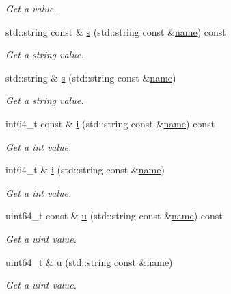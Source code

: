 \begin{DoxyCompactItemize}
\begin{DoxyCompactList}\small\item\em Get a value. \end{DoxyCompactList}\item 
std\+::string const  \& \hyperlink{class_settings_json_af6e26eec97fdd26f1ec720bbfe4df5b9}{s} (std\+::string const \&\hyperlink{class_settings_json_a301eda8c47d1140298fade3907c723d6}{name}) const
\begin{DoxyCompactList}\small\item\em Get a string value. \end{DoxyCompactList}\item 
std\+::string \& \hyperlink{class_settings_json_a28b88888063d5efe00ef2d8488129f2e}{s} (std\+::string const \&\hyperlink{class_settings_json_a301eda8c47d1140298fade3907c723d6}{name})
\begin{DoxyCompactList}\small\item\em Get a string value. \end{DoxyCompactList}\item 
int64\+\_\+t const  \& \hyperlink{class_settings_json_a79e1d47938088e08a84ac721807c1551}{i} (std\+::string const \&\hyperlink{class_settings_json_a301eda8c47d1140298fade3907c723d6}{name}) const
\begin{DoxyCompactList}\small\item\em Get a int value. \end{DoxyCompactList}\item 
int64\+\_\+t \& \hyperlink{class_settings_json_a0ccde304adda110610395b3b1f3b6fd0}{i} (std\+::string const \&\hyperlink{class_settings_json_a301eda8c47d1140298fade3907c723d6}{name})
\begin{DoxyCompactList}\small\item\em Get a int value. \end{DoxyCompactList}\item 
uint64\+\_\+t const  \& \hyperlink{class_settings_json_a94fe906c11e89abf423151c3816ec7d8}{u} (std\+::string const \&\hyperlink{class_settings_json_a301eda8c47d1140298fade3907c723d6}{name}) const
\begin{DoxyCompactList}\small\item\em Get a uint value. \end{DoxyCompactList}\item 
uint64\+\_\+t \& \hyperlink{class_settings_json_a70e9ce2aa10aed5d45fda0409b36db64}{u} (std\+::string const \&\hyperlink{class_settings_json_a301eda8c47d1140298fade3907c723d6}{name})
\begin{DoxyCompactList}\small\item\em Get a uint value. \end{DoxyCompactList}\item 

\end{DoxyCompactItemize}
